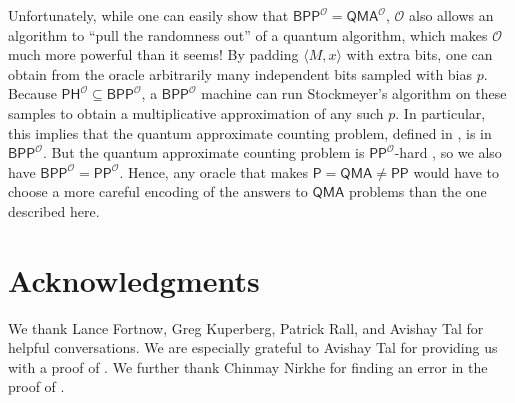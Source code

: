 \documentclass[11pt]{article}%
\begin{document}
Unfortunately, while one can easily show that $\mathsf{BPP}^\mathcal{O} = \mathsf{QMA}^\mathcal{O}$, $\mathcal{O}$ also allows an algorithm to ``pull the randomness out'' of a quantum algorithm, which makes $\mathcal{O}$ much more powerful than it seems! By padding $\langle M, x \rangle$ with extra bits, one can obtain from the oracle arbitrarily many independent bits sampled with bias $p$. Because $\mathsf{PH}^\mathcal{O} \subseteq \mathsf{BPP}^\mathcal{O}$, a $\mathsf{BPP}^\mathcal{O}$ machine can run Stockmeyer's algorithm \cite{Sto83} on these samples to obtain a multiplicative approximation of any such $p$. In particular, this implies that the quantum approximate counting problem, defined in , is in $\mathsf{BPP}^\mathcal{O}$. But the quantum approximate counting problem is $\mathsf{PP}^\mathcal{O}$-hard \cite{Kup15}, so we also have $\mathsf{BPP}^\mathcal{O} = \mathsf{PP}^\mathcal{O}$. Hence, any oracle that makes $\mathsf{P} = \mathsf{QMA} \neq \mathsf{PP}$ would have to choose a more careful encoding of the answers to $\mathsf{QMA}$ problems than the one described here.

\section{Acknowledgments}

We thank Lance Fortnow, Greg Kuperberg, Patrick Rall, and Avishay Tal for helpful conversations. We are especially grateful to Avishay Tal for providing us with a proof of . We further thank Chinmay Nirkhe for finding an error in the proof of .



\end{document}
